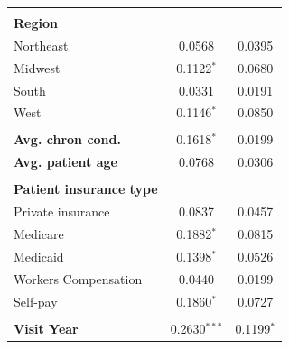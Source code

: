 \documentclass[12pt]{report}
\begin{document}
{\begin{center}
\begin{longtable}{lcc}
                                       &                          &                           \\
\textbf{Region}                        &                          &                           \\
Northeast                              & 0.0568                   & 0.0395                    \\
Midwest                                & 0.1122$^{*}$               & 0.0680                    \\
South                                  & 0.0331                   & 0.0191                    \\
West                                   & 0.1146$^{*}$               & 0.0850                    \\
                                       &                          &                           \\
\textbf{Avg. chron cond.}              & 0.1618$^{*}$               & 0.0199                    \\
\textbf{Avg. patient age}              & 0.0768                   & 0.0306                    \\
                                       &                          &                           \\
\textbf{Patient insurance type}        &                          &                           \\
Private insurance                      & 0.0837                   & 0.0457                    \\
Medicare                               & 0.1882$^{*}$               & 0.0815                    \\
Medicaid                               & 0.1398$^{*}$               & 0.0526                    \\
Workers Compensation                   & 0.0440                   & 0.0199                    \\
Self-pay                               & 0.1860$^{*}$               & 0.0727                    \\
                                       &                          &                           \\
\textbf{Visit Year}                    & 0.2630$^{***}$               & 0.1199$^{*}$    \\

\end{longtable}
\end{center}}
\end{document}
